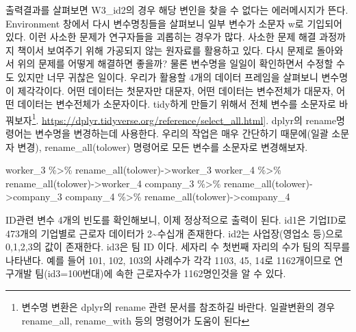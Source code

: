 \documentclass[
]{book}
\newenvironment{Shaded}{\begin{snugshade}}{\end{snugshade}}
\newcommand{\FunctionTok}[1]{\textcolor[rgb]{0.00,0.00,0.00}{#1}}
\newcommand{\NormalTok}[1]{#1}
\newcommand{\OtherTok}[1]{\textcolor[rgb]{0.56,0.35,0.01}{#1}}
\newcommand{\SpecialCharTok}[1]{\textcolor[rgb]{0.00,0.00,0.00}{#1}}
\theoremstyle{definition}
\theoremstyle{definition}
\theoremstyle{definition}
\theoremstyle{definition}
\theoremstyle{remark}
\begin{document}
출력결과를 살펴보면 W3\_id2의 경우 해당 변인을 찾을 수 없다는 에러메시지가 뜬다. Environment 창에서 다시 변수명칭들을 살펴보니 일부 변수가 소문자 w로 기입되어 있다. 이런 사소한 문제가 연구자들을 괴롭히는 경우가 많다. 사소한 문제 해결 과정까지 책이서 보여주기 위해 가공되지 않는 원자료를 활용하고 있다. 다시 문제로 돌아와서 위의 문제를 어떻게 해결하면 좋을까? 물론 변수명을 일일이 확인하면서 수정할 수도 있지만 너무 귀찮은 일이다. 우리가 활용할 4개의 데이터 프레임을 살펴보니 변수명이 제각각이다. 어떤 데이터는 첫문자만 대문자, 어떤 데이터는 변수전체가 대문자, 어떤 데이터는 변수전체가 소문자이다. tidy하게 만들기 위해서 전체 변수를 소문자로 바꿔보자\footnote{변수명 변환은 dplyr의 rename 관련 문서를 참조하길 바란다. 일괄변환의 경우 rename\_all, rename\_with 등의 명령어가 도움이 된다}. \url{https://dplyr.tidyverse.org/reference/select_all.html}{]}. dplyr의 rename명령어는 변수명을 변경하는데 사용한다. 우리의 작업은 매우 간단하기 때문에(일괄 소문자 변경), rename\_all(tolower) 명령어로 모든 변수를 소문자로 변경해보자.

\begin{Shaded}
\begin{Highlighting}[]
\NormalTok{worker\_3 }\SpecialCharTok{\%\textgreater{}\%} 
  \FunctionTok{rename\_all}\NormalTok{(tolower)}\OtherTok{{-}\textgreater{}}\NormalTok{worker\_3}
\NormalTok{worker\_4 }\SpecialCharTok{\%\textgreater{}\%} 
  \FunctionTok{rename\_all}\NormalTok{(tolower)}\OtherTok{{-}\textgreater{}}\NormalTok{worker\_4}
\NormalTok{company\_3 }\SpecialCharTok{\%\textgreater{}\%} 
  \FunctionTok{rename\_all}\NormalTok{(tolower)}\OtherTok{{-}\textgreater{}}\NormalTok{company\_3}
\NormalTok{company\_4 }\SpecialCharTok{\%\textgreater{}\%} 
  \FunctionTok{rename\_all}\NormalTok{(tolower)}\OtherTok{{-}\textgreater{}}\NormalTok{company\_4}
\end{Highlighting}
\end{Shaded}

ID관련 변수 4개의 빈도를 확인해보니, 이제 정상적으로 출력이 된다. id1은 기업ID로 473개의 기업별로 근로자 데이터가 2\textasciitilde 수십개 존재한다. id2는 사업장(영업소 등)으로 0,1,2,3의 값이 존재한다. id3은 팀 ID 이다. 세자리 수 첫번째 자리의 수가 팀의 직무를 나타낸다. 예를 들어 101, 102, 103의 사례수가 각각 1103, 45, 14로 1162개이므로 연구개발 팀(id3=100번대)에 속한 근로자수가 1162명인것을 알 수 있다.
\end{document}

